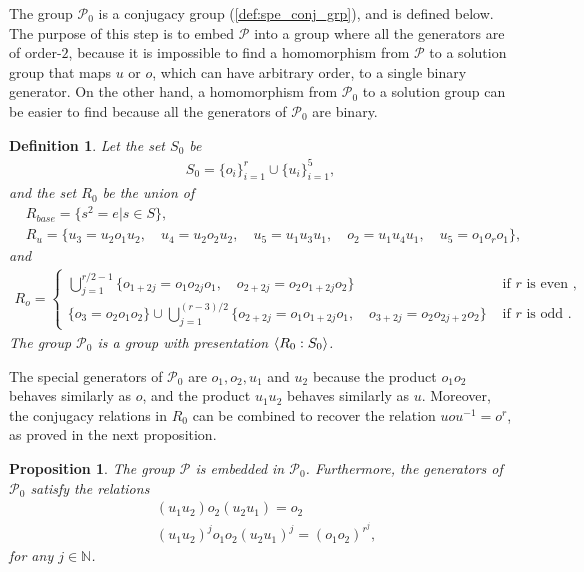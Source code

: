 \documentclass[11pt,letterpaper]{article}
\DeclarePairedDelimiter{\ip}{\langle}{\rangle}
\newcommand{\N}{\mathbb{N}}
\newcommand{\1}{\mathbb{1}}
\newcommand{\Pg}{\mathcal{P}}
\newtheorem{proposition}[theorem]{Proposition}
\newtheorem{definition}[theorem]{Definition}
\theoremstyle{definition}
\begin{document}
The group $\Pg_0$ is a conjugacy group (\cref{def:spe_conj_grp}), and is defined below.
The purpose of this step is to embed $\Pg$ into a group where all the
generators are of order-$2$, because
it is impossible to find a homomorphism from $\Pg$ to a solution group that maps $u$ or $o$, which can have arbitrary order, to a single binary generator. 
On the other hand, a homomorphism from $\Pg_0$ to a solution group can be easier to find because all the generators of $\Pg_0$ are binary.
\begin{definition}	
\label{def:g0}
	Let the set $S_0$ be 
	\begin{align*}
		S_0 = \{o_i\}_{i=1}^{r} \cup \{u_i\}_{i=1}^5,
	\end{align*}
	and the set $R_0$ be the union of 
	\begin{align*}
	&R_{base} = \{s^2 = e | s \in S\},\\
	&R_{u} = \{ u_3 = u_2o_1u_2, \quad u_4 = u_2o_2u_2, \quad 
	u_5 = u_1u_3u_1, \quad o_2 = u_1u_4u_1, \quad u_5 = o_1 o_r o_1\},
	\end{align*}
	and 
	\begin{align*}
	R_o = 
	\begin{cases} 
	\bigcup_{j=1}^{r/2-1}\{ o_{1+2j} = o_1o_{2j}o_1, \quad o_{2+2j} = o_2o_{1+2j}o_2\}  &\text{ if $r$ is even },\\
	\{o_3 = o_2o_1o_2\} \cup \bigcup_{j=1}^{(r-3)/2}\{
	 o_{2+2j} =o_1o_{1+2j}o_1, \quad o_{3+2j} = o_2o_{2j+2}o_2 \} &\text{ if $r$ is odd }.
	\end{cases}
	\end{align*}
	The group $\Pg_0$ is a group with presentation $\ip{R_0:S_0}$.
\end{definition}
The special generators of $\Pg_0$ are $o_1, o_2, u_1$ and $u_2$ because the product $o_1o_2$ behaves similarly as $o$,
and the product $u_1u_2$ behaves similarly as $u$.
Moreover, the conjugacy relations in $R_0$ can be combined to recover the relation $uou^{-1} = o^r$,
as proved in the next proposition.
\begin{proposition}
    \label{prop:g0}
	The group $\Pg$ is embedded in $\Pg_0$.
	Furthermore, the generators of $\Pg_0$ satisfy the relations 
	\begin{align}
	    \label{eq:uo_comm}
	    &(u_1u_2) o_2 (u_2u_1) = o_2 \\ 
	    \label{eq:uo_rel}
		&(u_1u_2)^j o_1o_2 (u_2u_1)^j = (o_1o_2)^{r^j}, 
	\end{align}
	for any $ j \in \N$.
\end{proposition}
\end{document}
